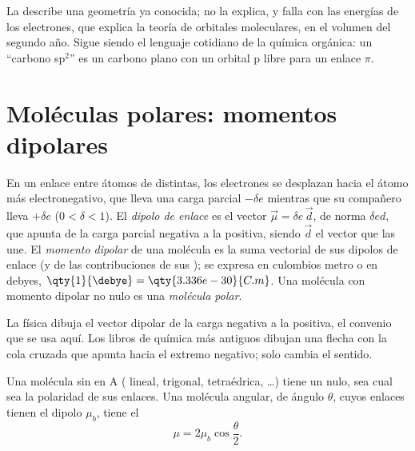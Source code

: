 \begin{remark}\label{rem:b1:lewis-resonance-vsepr:hybrid-limit}
La  describe una geometría ya conocida; no la explica, y
falla con las energías de los electrones, que explica la teoría de
orbitales moleculares, en el volumen del segundo año. Sigue siendo el
lenguaje cotidiano de la química orgánica: un ``carbono sp$^2$'' es un
carbono plano con un orbital p libre para un enlace $\pi$.
\end{remark}

\section{Moléculas polares: momentos dipolares}

\begin{definition}\label{def:b1:lewis-resonance-vsepr:dipole}
En un enlace entre átomos de  distintas, los
electrones se desplazan hacia el átomo más electronegativo, que lleva una
carga parcial $-\delta e$ mientras que su compañero lleva $+\delta e$
($0 < \delta < 1$). El \emph{dipolo de enlace} es
el vector $\vec\mu = \delta e\,
\vec d$, de norma $\delta e d$, que apunta de la carga parcial negativa a
la positiva, siendo $\vec d$ el vector que las une. El \emph{momento
dipolar} de una molécula es la suma vectorial de
sus dipolos de enlace (y de las contribuciones de sus ); se expresa en culombios metro o en debyes, $\qty{1}{\debye} =
\qty{3.336e-30}{C.m}$. Una molécula con momento dipolar no nulo es una
\emph{molécula polar}.
\end{definition}

\begin{remark}\label{rem:b1:lewis-resonance-vsepr:convention}
La física dibuja el vector dipolar de la carga negativa a la positiva,
el convenio que se usa aquí. Los libros de química más antiguos dibujan
una flecha con la cola cruzada que apunta hacia el extremo negativo; solo
cambia el sentido.
\end{remark}

\begin{proposition}\label{prop:b1:lewis-resonance-vsepr:dipole-sum}
Una molécula  sin  en A ( lineal,
 trigonal,  tetraédrica, \dots) tiene un 
nulo, sea cual sea la polaridad de sus enlaces. Una molécula 
angular, de ángulo $\theta$, cuyos enlaces tienen el dipolo $\mu_b$, tiene
el 
\[
  \mu = 2\mu_b \cos\frac{\theta}{2} .
\]
\end{proposition}

